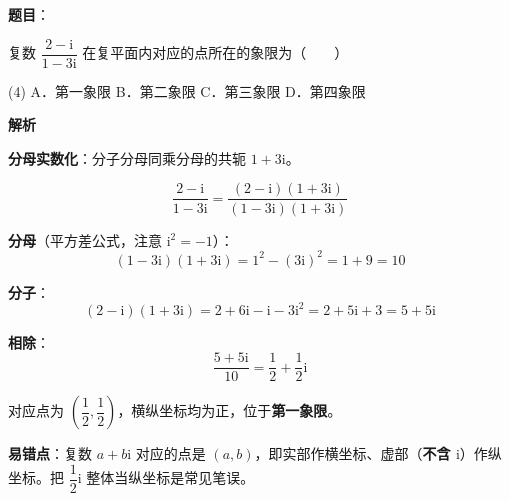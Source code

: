 \begin{answer}

\textbf{题目}：

复数 $\dfrac{2-\mathrm i}{1-3\mathrm i}$ 在复平面内对应的点所在的象限为\mbox{（　　）}

\begin{gkopts}(4)
\task A．第一象限
\task B．第二象限
\task C．第三象限
\task D．第四象限
\end{gkopts}

\textbf{解析}

\textbf{分母实数化}：分子分母同乘分母的共轭 $1+3\mathrm i$。

\nopagebreak[4]
\[\frac{2-\mathrm i}{1-3\mathrm i}=\frac{(2-\mathrm i)(1+3\mathrm i)}{(1-3\mathrm i)(1+3\mathrm i)}\]

\textbf{分母}（平方差公式，注意 $\mathrm i^{2}=-1$）：
\nopagebreak[4]
\[(1-3\mathrm i)(1+3\mathrm i)=1^{2}-(3\mathrm i)^{2}=1+9=10\]

\textbf{分子}：
\nopagebreak[4]
\[(2-\mathrm i)(1+3\mathrm i)=2+6\mathrm i-\mathrm i-3\mathrm i^{2}=2+5\mathrm i+3=5+5\mathrm i\]

\textbf{相除}：
\nopagebreak[4]
\[\frac{5+5\mathrm i}{10}=\frac12+\frac12\mathrm i\]

对应点为 $\left(\dfrac12,\dfrac12\right)$，横纵坐标均为正，位于\textbf{第一象限}。

\begin{gktip}
\textbf{易错点}：复数 $a+b\mathrm i$ 对应的点是 $(a,b)$，即实部作横坐标、虚部（\textbf{不含 $\mathrm i$}）作纵坐标。把 $\dfrac12\mathrm i$ 整体当纵坐标是常见笔误。
\end{gktip}


\par\medskip

\end{answer}
